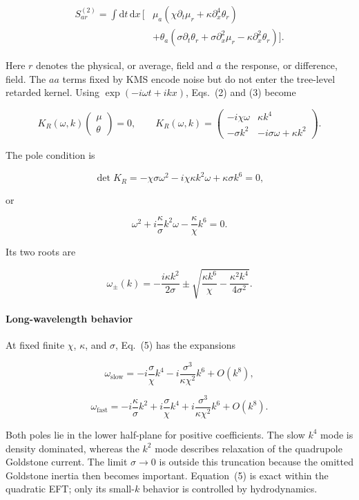 \[
\begin{aligned}
S_{ar}^{(2)}=\int\mathrm{d}t\,\mathrm{d}x\,\bigl[&
\mu_a\left(\chi\partial_t\mu_r
+\kappa\partial_x^4\theta_r\right)\\
&+\theta_a\left(
\sigma\partial_t\theta_r
+\sigma\partial_x^2\mu_r
-\kappa\partial_x^2\theta_r
\right)\bigr].
\end{aligned}
\]

Here $r$ denotes the physical, or average, field and $a$ the response, or
difference, field. The $aa$ terms fixed by KMS encode noise but do not enter
the tree-level retarded kernel. Using
$\exp(-i\omega t+ikx)$, Eqs.~(2) and (3) become

\[
K_R(\omega,k)
\begin{pmatrix}
\mu\\
\theta
\end{pmatrix}
=0,
\qquad
K_R(\omega,k)=
\begin{pmatrix}
-i\chi\omega & \kappa k^4\\
-\sigma k^2 & -i\sigma\omega+\kappa k^2
\end{pmatrix}.
\]

The pole condition is

\[
\det K_R
=-\chi\sigma\omega^2
-i\chi\kappa k^2\omega
+\kappa\sigma k^6
=0,
\]

or

\[
\omega^2
+i\frac{\kappa}{\sigma}k^2\omega
-\frac{\kappa}{\chi}k^6=0.
\tag{4}
\]

Its two roots are

\[
\omega_\pm(k)
=-\frac{i\kappa k^2}{2\sigma}
\pm\sqrt{
\frac{\kappa k^6}{\chi}
-\frac{\kappa^2k^4}{4\sigma^2}
}.
\tag{5}
\]

\paragraph*{Long-wavelength behavior}

At fixed finite $\chi$, $\kappa$, and $\sigma$, Eq.~(5) has the expansions

\[
\omega_{\mathrm{slow}}
=-i\frac{\sigma}{\chi}k^4
-i\frac{\sigma^3}{\kappa\chi^2}k^6
+O(k^8),
\]

\[
\omega_{\mathrm{fast}}
=-i\frac{\kappa}{\sigma}k^2
+i\frac{\sigma}{\chi}k^4
+i\frac{\sigma^3}{\kappa\chi^2}k^6
+O(k^8).
\]

Both poles lie in the lower half-plane for positive coefficients. The slow
$k^4$ mode is density dominated, whereas the $k^2$ mode describes relaxation
of the quadrupole Goldstone current. The limit $\sigma\to0$ is outside this
truncation because the omitted Goldstone inertia then becomes important.
Equation~(5) is exact within the quadratic EFT; only its small-$k$ behavior is
controlled by hydrodynamics.

\endgroup
